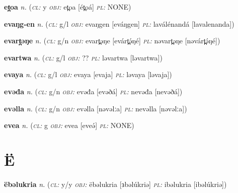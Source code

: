 \newentry
\headword\textbf{et̪oa}  
\ipa{[ét̪oá]}
\synpos\textit{n.} 
\class(\textit{\textsc{cl:}} {y}
\object\textit{\textsc{obj:}} et̪oa [ét̪oá]
\plural\textit{\textsc{pl:}} NONE)

\newentry
\headword\textbf{evaŋg-en}  
\ipa{[eváŋg-en]}
\synpos\textit{n.} 
\class(\textit{\textsc{cl:}} {g/l}
\object\textit{\textsc{obj:}} evaŋgen [eváŋgen]
\plural\textit{\textsc{pl:}} laválénandá [lavalenanda])

\newentry
\headword\textbf{evart̪əŋe}  
\ipa{[evárt̪ə́ŋé]}
\synpos\textit{n.} 
\class(\textit{\textsc{cl:}} {g/n}
\object\textit{\textsc{obj:}} evart̪əŋe [evárt̪ə́ŋé]
\plural\textit{\textsc{pl:}} nəvart̪əŋe [nəvárt̪ə́ŋé])

\newentry
\headword\textbf{evartwa}  
\ipa{[evartwa]}
\synpos\textit{n.} 
\class(\textit{\textsc{cl:}} {g/l}
\object\textit{\textsc{obj:}} ??
\plural\textit{\textsc{pl:}} ləvartwa [ləvartwa])

\newentry
\headword\textbf{evaya}  
\ipa{[evaja]}
\synpos\textit{n.} 
\class(\textit{\textsc{cl:}} {g/l}
\object\textit{\textsc{obj:}} evaya [evaja]
\plural\textit{\textsc{pl:}} ləvaya [ləvaja])

\newentry
\headword\textbf{evəđa}  
\ipa{[evəðá]}
\synpos\textit{n.} 
\class(\textit{\textsc{cl:}} {g/n}
\object\textit{\textsc{obj:}} evəđa [evəðá]
\plural\textit{\textsc{pl:}} nevəđa [nevəðá])

\newentry
\headword\textbf{evəlla}  
\ipa{[evəlːa]}
\synpos\textit{n.} 
\class(\textit{\textsc{cl:}} {g/n}
\object\textit{\textsc{obj:}} evəlla [nəvəlːa]
\plural\textit{\textsc{pl:}} nevəlla [nəvəlːa])

\newentry
\headword\textbf{evea}  
\ipa{[eveə́]}
\synpos\textit{n.} 
\class(\textit{\textsc{cl:}} {g}
\object\textit{\textsc{obj:}} evea [eveə́]
\plural\textit{\textsc{pl:}} NONE)

\section*{Ë}\label{Ë}

\newentry
\headword\textbf{ëbəlukria}  
\synpos\textit{n.} 
\class(\textit{\textsc{cl:}} {y/y}
\object\textit{\textsc{obj:}} ëbəlukria [ɜbəlúkriə]
\plural\textit{\textsc{pl:}} ibəlukria [ibəlúkriə])

